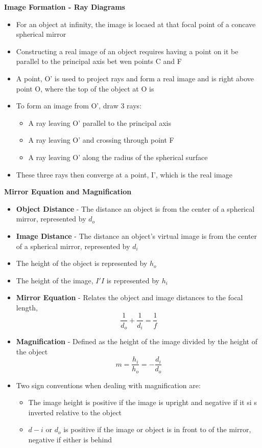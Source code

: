 \textbf{Image Formation - Ray Diagrams} 
\begin{itemize}
    \item For an object at infinity, the image is locaed at that focal point of a concave spherical mirror
    \item Constructing a real image of an object requires having a point on it be parallel to the principal axis bet wen points C and F
    \item A point, O' is used to project rays and form a real image and is right above point O, where the top of the object at O is
    \item To form an image from O', draw 3 rays:
    \begin{itemize}
        \item A ray leaving O' parallel to the principal axis
        \item A ray leaving O' and crossing through point F
        \item A ray leaving O' along the radius of the spherical surface
    \end{itemize}
    \item These three rays then converge at a point, I', which is the real image
\end{itemize}

\textbf{Mirror Equation and Magnification}
\begin{itemize}
    \item \textbf{Object Distance} - The distance an object is from the center of a spherical mirror, represented by \(d_o\)
    \item \textbf{Image Distance} - The distance an object's virtual image is from the center of a spherical mirror, represented by \(d_i\)
    \item The height of the object is represented by \(h_o\) 
    \item The height of the image, \(I'I\) is represented by \(h_i\) 
    \item \textbf{Mirror Equation} - Relates the object and image distances to the focal length, \[\frac{1}{d_o}+\frac{1}{d_i}=\frac{1}{f}\]
    \item \textbf{Magnification} - Defined as the height of the image divided by the height of the object \[m=\frac{h_i}{h_o}=-\frac{d_i}{d_o}\]
    \item Two sign conventions when dealing with magnification are:
    \begin{itemize}
        \item The image height is positive if the image is upright and negative if it si s inverted relative to the object
        \item \(d-i\) or \(d_o\) is positive if the image or object is in front to of the mirror, negative if either is behind
    \end{itemize}
\end{itemize}

